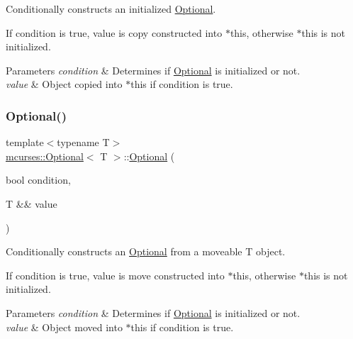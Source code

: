 Conditionally constructs an initialized \hyperlink{classmcurses_1_1Optional}{Optional}. 

If condition is true, {\ttfamily value} is copy constructed into $\ast$this, otherwise $\ast$this is not initialized. 
\begin{DoxyParams}{Parameters}
{\em condition} & Determines if \hyperlink{classmcurses_1_1Optional}{Optional} is initialized or not. \\
\hline
{\em value} & Object copied into $\ast$this if {\ttfamily condition} is true. \\
\hline
\end{DoxyParams}
\hypertarget{classmcurses_1_1Optional_a53b4829b1acfd54744d6dd8edb6dc2dc}{}\label{classmcurses_1_1Optional_a53b4829b1acfd54744d6dd8edb6dc2dc} 
\subsubsection{\texorpdfstring{Optional()}{Optional()}\hspace{0.1cm}{\footnotesize\ttfamily [6/10]}}
{\footnotesize\ttfamily template$<$typename T$>$ \\
\hyperlink{classmcurses_1_1Optional}{mcurses\+::\+Optional}$<$ T $>$\+::\hyperlink{classmcurses_1_1Optional}{Optional} (\begin{DoxyParamCaption}\item[{bool}]{condition,  }\item[{T \&\&}]{value }\end{DoxyParamCaption})\hspace{0.3cm}{\ttfamily [inline]}}



Conditionally constructs an \hyperlink{classmcurses_1_1Optional}{Optional} from a moveable T object. 

If condition is true, {\ttfamily value} is move constructed into $\ast$this, otherwise $\ast$this is not initialized. 
\begin{DoxyParams}{Parameters}
{\em condition} & Determines if \hyperlink{classmcurses_1_1Optional}{Optional} is initialized or not. \\
\hline
{\em value} & Object moved into $\ast$this if {\ttfamily condition} is true. \\
\hline
\end{DoxyParams}
\hypertarget{classmcurses_1_1Optional_a54206fd5a298d201a94fcbf869442169}{}\label{classmcurses_1_1Optional_a54206fd5a298d201a94fcbf869442169} 
